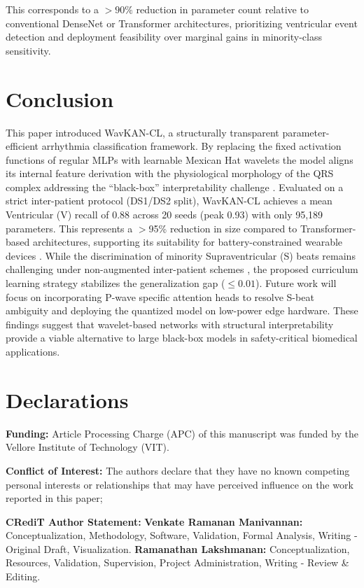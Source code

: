 \documentclass[pdflatex,sn-mathphys-num]{sn-jnl}
\theoremstyle{thmstyleone}
\theoremstyle{thmstyletwo}
\theoremstyle{thmstylethree}
\begin{document}
This corresponds to a $> 90\%$ reduction in parameter count relative to conventional DenseNet or Transformer architectures, prioritizing ventricular event detection and deployment feasibility over marginal gains in minority-class sensitivity.

\section{Conclusion}
\label{sec:conclusion}
This paper introduced WavKAN-CL, a structurally transparent parameter-efficient arrhythmia classification framework. By replacing the fixed activation functions of regular MLPs with learnable Mexican Hat wavelets the model aligns its internal feature derivation with the physiological morphology of the QRS complex addressing the ``black-box'' interpretability challenge \cite{taleban_explainable_2026}. Evaluated on a strict inter-patient protocol (DS1/DS2 split), WavKAN-CL achieves a mean Ventricular (V) recall of 0.88 across 20 seeds (peak 0.93) with only 95,189 parameters. This represents a $>$95\% reduction in size compared to Transformer-based architectures, supporting its suitability for battery-constrained wearable devices \cite{farag_tiny_2023}. While the discrimination of minority Supraventricular (S) beats remains challenging under non-augmented inter-patient schemes \cite{bahrami_investigation_2025}, the proposed curriculum learning strategy stabilizes the generalization gap ($\le 0.01$). Future work will focus on incorporating P-wave specific attention heads to resolve S-beat ambiguity and deploying the quantized model on low-power edge hardware. These findings suggest that wavelet-based networks with structural interpretability provide a viable alternative to large black-box models in safety-critical biomedical applications.

\backmatter

\section*{Declarations}

\textbf{Funding:} Article Processing Charge (APC) of this manuscript was funded by the Vellore Institute of Technology (VIT).

\textbf{Conflict of Interest:} The authors declare that they have no known competing personal interests or relationships that may have perceived influence on the work reported in this paper;

\textbf{CRediT Author Statement:} 
\textbf{Venkate Ramanan Manivannan:} Conceptualization, Methodology, Software, Validation, Formal Analysis, Writing - Original Draft, Visualization. 
\textbf{Ramanathan Lakshmanan:} Conceptualization, Resources, Validation, Supervision, Project Administration, Writing - Review \& Editing.
\end{document}
